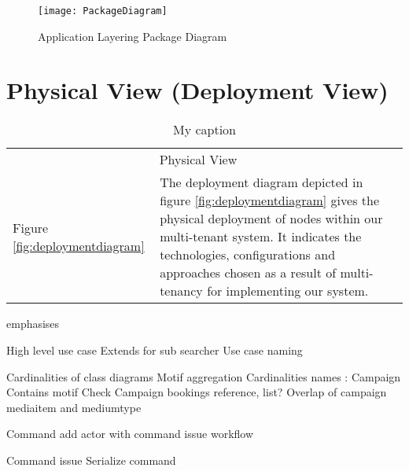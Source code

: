 
\begin{figure}
\centering
\texttt{[image: PackageDiagram]}
\caption{Application Layering Package Diagram}
\label{fig:packagediagram}
\end{figure}


\section{Physical View (Deployment View)}

\begin{table}[h]
\centering
\begin{tabularx}{\textwidth}{lXl}
\cline{1-2}
\multicolumn{2}{|c|}{\cellcolor[HTML]{EFEFEF}Physical View} &  \\ \cline{1-2}
\multicolumn{1}{|l|}{Figure \ref{fig:deploymentdiagram}} & \multicolumn{1}{l|}{The deployment diagram depicted in figure \ref{fig:deploymentdiagram} gives the physical deployment of nodes within our multi-tenant system. It indicates the technologies, configurations and approaches chosen as a result of multi-tenancy for implementing our system.} &  \\ \cline{1-2}
\cline{1-2}
\end{tabularx}
\caption{My caption}
\label{my-label}
\end{table}


emphasises



High level use case
Extends for sub searcher
Use case  naming

Cardinalities of class diagrams
Motif aggregation
Cardinalities names : Campaign Contains motif
Check Campaign bookings reference, list?
Overlap of campaign mediaitem and mediumtype


Command add actor with command issue workflow


Command issue
Serialize command

